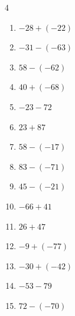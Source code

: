 \begin{multicols}{4}
\begin{enumerate}
        \phantom{$=80$}

  \item $-28+(-22)$

        \phantom{$=-50$}

  \item $-31-(-63)$

        \phantom{$=32$}

  \item $58-(-62)$

        \phantom{$=120$}

\columnbreak %

  \item $40+(-68)$

        \phantom{$=-28$}

  \item $-23-72$

        \phantom{$=-95$}

  \item $23+87$

        \phantom{$=110$}

  \item $58-(-17)$

        \phantom{$=75$}

  \item $83-(-71)$

        \phantom{$=154$}

  \item $45-(-21)$

        \phantom{$=66$}

  \item $-66+41$

        \phantom{$=-25$}

  \item $26+47$

        \phantom{$=73$}

  \item $-9+(-77)$

        \phantom{$=-86$}

  \item $-30+(-42)$

        \phantom{$=-72$}

  \item $-53-79$

        \phantom{$=-132$}

  \item $72-(-70)$

        \phantom{$=142$}


\end{enumerate}
\end{multicols}

